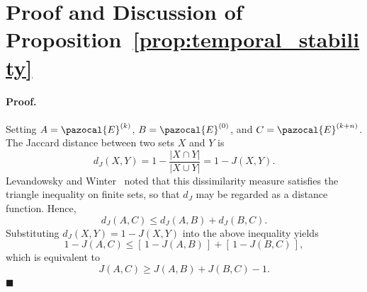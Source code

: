 \documentclass[a4paper,fleqn]{cas-sc}
\begin{document}
%






\appendix


\section{Proof and Discussion of Proposition~\ref{prop:temporal_stability}}
\label{app:temporal_stability_proof}

\paragraph{Proof.}
Setting $A=\pazocal{E}^{(k)}$, $B=\pazocal{E}^{(0)}$, and $C=\pazocal{E}^{(k+n)}$.
The Jaccard distance between two sets $X$ and $Y$ is
\[
d_J(X,Y)=1-\frac{|X\cap Y|}{|X\cup Y|}=1-J(X,Y).
\]
Levandowsky and Winter~\citep{levandowsky1971distance} noted that this
dissimilarity measure satisfies the triangle inequality on finite sets,
so that $d_J$ may be regarded as a distance function. Hence,
\[
d_J(A,C)\le d_J(A,B)+d_J(B,C).
\]
Substituting $d_J(X,Y)=1-J(X,Y)$ into the above inequality yields
\[
1-J(A,C)
\le [\,1-J(A,B)\,]+[\,1-J(B,C)\,],
\]
which is equivalent to
\[
J(A,C)\ge J(A,B)+J(B,C)-1.
\]
\hfill$\blacksquare$
\end{document}
